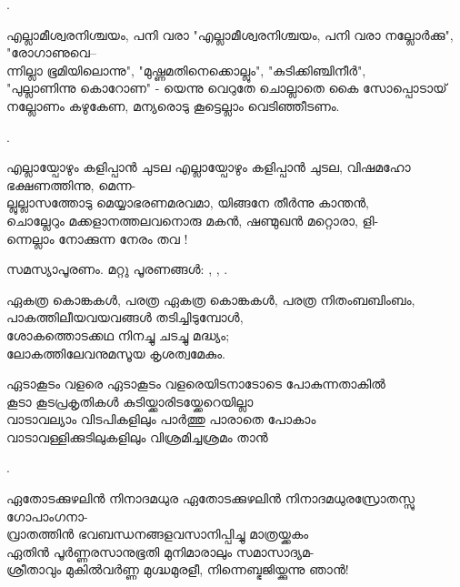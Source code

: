 \begin{enumerate}
.

\begin{slokam}{\VSv}{\UN}{എല്ലാമീശ്വരനിശ്ചയം, പനി വരാ}
"എല്ലാമീശ്വരനിശ്ചയം, പനി വരാ നല്ലോർക്കു", "രോഗാണുവെ--\\
ന്നില്ലാ ഭൂമിയിലൊന്നു", "മുഷ്ണമതിനെക്കൊല്ലും", "കുടിക്കിഞ്ചിനീർ",\\
"പുല്ലാണിന്നു കൊറോണ" - യെന്നു വെറുതേ ചൊല്ലാതെ കൈ സോപ്പൊടായ്\\
നല്ലോണം കഴുകേണ, മന്യരൊടു കൂട്ടെല്ലാം വെടിഞ്ഞീടണം.
\end{slokam}

.


\begin{slokam}{\VSr}{\VenM}{എല്ലായ്പോഴും കളിപ്പാൻ ചുടല}
എല്ലായ്പോഴും കളിപ്പാൻ ചുടല, വിഷമഹോ ഭക്ഷണത്തിന്നു, മെന്ന-\\
ല്ലുല്ലാസത്തോടു മെയ്യാഭരണമരവമാ, യിങ്ങനേ തീർന്നു കാന്തൻ,\\
ചൊല്ലേറും മക്കളാനത്തലവനൊരു മകൻ, ഷണ്മുഖൻ മറ്റൊരാ, ളി-\\
ന്നെല്ലാം നോക്കുന്ന നേരം തവ !
\end{slokam}


സമസ്യാപൂരണം. മറ്റു പൂരണങ്ങൾ: , , .


\begin{slokam}{\VVt}{\Ull}{ഏകത്ര കൊങ്കകള്‍, പരത്ര}
ഏകത്ര കൊങ്കകള്‍, പരത്ര നിതംബബിംബം,\\
പാകത്തിലീയവയവങ്ങള്‍ തടിച്ചിടുമ്പോള്‍,\\
ശോകത്തൊടക്കഥ നിനച്ചു ചടച്ചു മദ്ധ്യം;\\
ലോകത്തിലേവനുമസൂയ കൃശത്വമേകും.
\end{slokam}



\begin{slokam}{\VMk}{\KV}{ഏടാകൂടം വളരെ}
ഏടാകൂടം വളരെയിടനാടോടെ പോകുന്നതാകിൽ\\
കൂടാ കൂടപ്രകൃതികൾ കുടിയ്ക്കാരിടയ്ക്കേറെയില്ലാ\\
വാടാവല്യാം വിടപികളിലും പാർത്തു പാരാതെ പോകാം\\
വാടാവള്ളിക്കുടിലുകളിലും വിശ്രമിച്ചശ്രമം താൻ
\end{slokam}


.


\begin{slokam}{\VSv}{\VKG}{ഏതോടക്കുഴലിൻ നിനാദമധുര}
 ഏതോടക്കുഴലിൻ നിനാദമധുരസ്രോതസ്സു ഗോപാംഗനാ-\\
വ്രാതത്തിന്‍ ഭവബന്ധനങ്ങളവസാനിപ്പിച്ചു മാത്രയ്ക്കകം\\
ഏതിന്‍ പൂര്‍ണ്ണരസാനുഭൂതി മുനിമാരാലും സമാസാദ്യമ-\\
ശ്രീതാവും മുകില്‍വര്‍ണ്ണ മുഗ്ദ്ധമുരളീ, നിന്നെബ്ഭജിയ്ക്കുന്നു ഞാന്‍!
\end{slokam}


\end{enumerate}

